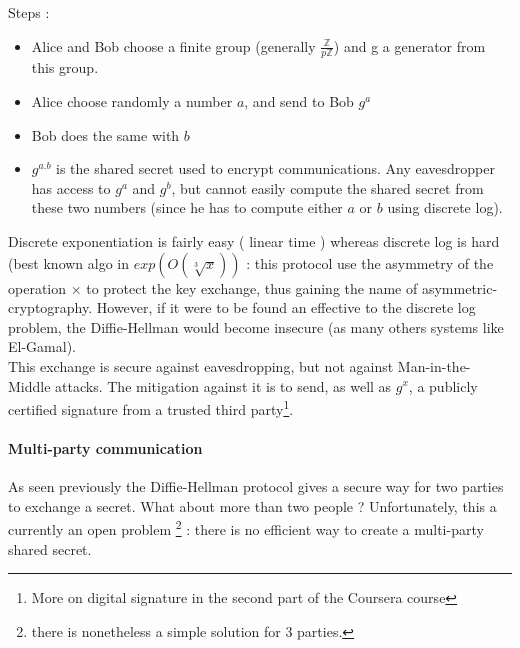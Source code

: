 Steps : 
\begin{itemize}
	\item Alice and Bob choose a finite group (generally $\frac{\mathbb{Z}}{p\mathbb{Z}}$) and g a generator from this group. 
	\item Alice choose randomly a number $a$, and send to Bob $g^a$
	\item Bob does the same with $b$
	\item $g^{a.b}$ is the shared secret used to encrypt communications. Any eavesdropper has access to $g^{a}$ and $g^{b}$, but cannot easily compute the shared secret from these two numbers (since he has to compute either $a$ or $b$ using discrete log).
\end{itemize}

Discrete exponentiation is fairly easy ( linear time ) whereas discrete log is hard (best known algo in $exp(O(\sqrt[3]{x}))$ : this protocol use the asymmetry of the operation $\times $ to protect the key exchange, thus gaining the name of asymmetric-cryptography. However, if it were to be found an effective to the discrete log problem, the Diffie-Hellman would become insecure (as many others systems like El-Gamal).\\

This exchange is secure against eavesdropping, but not against Man-in-the-Middle attacks. The mitigation against it is to send, as well as $g^x$, a publicly certified signature from a trusted third party\footnote{More on digital signature in the second part of the Coursera course}.\\

\paragraph{Multi-party communication}
As seen previously the Diffie-Hellman protocol gives a secure way for two parties to exchange a secret. What about more than two people ? Unfortunately, this a currently an open problem \footnote{there is nonetheless a simple solution for 3 parties.} : there is no efficient way to create a multi-party shared secret.






